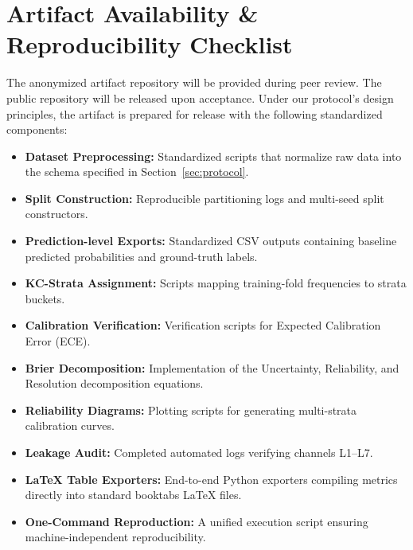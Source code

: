 \documentclass[conference]{IEEEtran}
\begin{document}







\section*{Artifact Availability \& Reproducibility Checklist}
The anonymized artifact repository will be provided during peer review. The public repository will be released upon acceptance. Under our protocol's design principles, the artifact is prepared for release with the following standardized components:
\begin{itemize}
    \item \textbf{Dataset Preprocessing:} Standardized scripts that normalize raw data into the schema specified in Section~\ref{sec:protocol}.
    \item \textbf{Split Construction:} Reproducible partitioning logs and multi-seed split constructors.
    \item \textbf{Prediction-level Exports:} Standardized CSV outputs containing baseline predicted probabilities and ground-truth labels.
    \item \textbf{KC-Strata Assignment:} Scripts mapping training-fold frequencies to strata buckets.
    \item \textbf{Calibration Verification:} Verification scripts for Expected Calibration Error (ECE).
    \item \textbf{Brier Decomposition:} Implementation of the Uncertainty, Reliability, and Resolution decomposition equations.
    \item \textbf{Reliability Diagrams:} Plotting scripts for generating multi-strata calibration curves.
    \item \textbf{Leakage Audit:} Completed automated logs verifying channels L1--L7.
    \item \textbf{LaTeX Table Exporters:} End-to-end Python exporters compiling metrics directly into standard booktabs LaTeX files.
    \item \textbf{One-Command Reproduction:} A unified execution script ensuring machine-independent reproducibility.
\end{itemize}

\appendices




\end{document}
